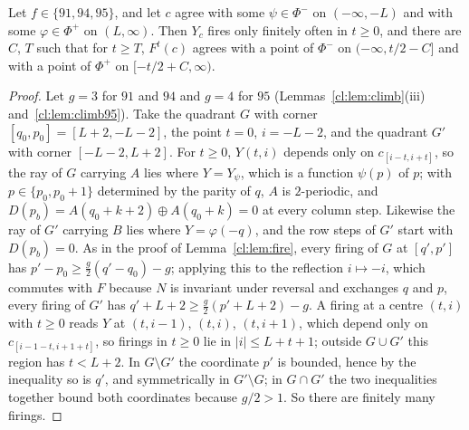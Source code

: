 \begin{proposition}\label{cl:prop:Fprime}
Let $f\in\{91,94,95\}$, and let $c$ agree with some $\psi\in\Phi^-$ on $(-\infty,-L)$ and with some $\varphi\in\Phi^+$ on $(L,\infty)$. Then $Y_c$ fires only finitely often in $t\ge0$, and there are $C$, $T$ such that for $t\ge T$, $F^t(c)$ agrees with a point of $\Phi^-$ on $(-\infty,t/2-C]$ and with a point of $\Phi^+$ on $[-t/2+C,\infty)$.
\end{proposition}

\begin{proof}
Let $g=3$ for $91$ and $94$ and $g=4$ for $95$ (Lemmas~\ref{cl:lem:climb}(iii) and~\ref{cl:lem:climb95}). Take the quadrant $G$ with corner $[q_0,p_0]=[L+2,-L-2]$, the point $t=0$, $i=-L-2$, and the quadrant $G'$ with corner $[-L-2,L+2]$. For $t\ge0$, $Y(t,i)$ depends only on $c_{[i-t,i+t]}$, so the ray of $G$ carrying $A$ lies where $Y=Y_\psi$, which is a function $\psi(p)$ of $p$; with $p\in\{p_0,p_0+1\}$ determined by the parity of $q$, $A$ is $2$-periodic, and $D(p_b)=A(q_0+k+2)\oplus A(q_0+k)=0$ at every column step. Likewise the ray of $G'$ carrying $B$ lies where $Y=\varphi(-q)$, and the row steps of $G'$ start with $D(p_b)=0$. As in the proof of Lemma~\ref{cl:lem:fire}, every firing of $G$ at $[q',p']$ has $p'-p_0\ge\frac g2(q'-q_0)-g$; applying this to the reflection $i\mapsto-i$, which commutes with $F$ because $N$ is invariant under reversal and exchanges $q$ and $p$, every firing of $G'$ has $q'+L+2\ge\frac g2(p'+L+2)-g$. A firing at a centre $(t,i)$ with $t\ge0$ reads $Y$ at $(t,i-1)$, $(t,i)$, $(t,i+1)$, which depend only on $c_{[i-1-t,i+1+t]}$, so firings in $t\ge0$ lie in $|i|\le L+t+1$; outside $G\cup G'$ this region has $t<L+2$. In $G\setminus G'$ the coordinate $p'$ is bounded, hence by the inequality so is $q'$, and symmetrically in $G'\setminus G$; in $G\cap G'$ the two inequalities together bound both coordinates because $g/2>1$. So there are finitely many firings.


\end{proof}
